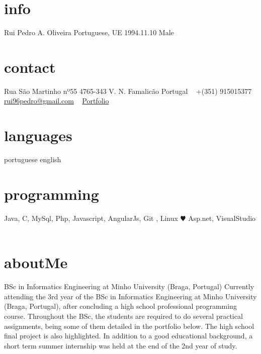\documentclass[]{friggeri-cv} %
\begin{document}


\begin{aside} %
\section{info}
Rui Pedro A. Oliveira
Portuguese, UE
1994.11.10
Male
\section{contact}
Rua São Martinho nº55
4765-343 V. N. Famalicão
Portugal
~
+(351) 915015377
~
\href{mailto:rui96pedro@gmail.com}{rui96pedro@gmail.com}
~
\href{https://bitbucket.org/ruiOliveiras94}{Portfolio}
~
\section{languages}
portuguese
english 
\section{programming}
Java, C, MySql,
Php, Javascript, AngularJs,
Git , Linux {\color{red} $\varheartsuit$} 
Asp.net, VisualStudio
~
\end{aside}

\section{aboutMe}
BSc in Informatics Engineering at Minho University (Braga, Portugal)
Currently attending the 3rd year of the BSc in Informatics Engineering at Minho University (Braga, Portugal), after concluding a high school professional programming course. Throughout the BSc, the students are required to do several practical assignments, being some of them detailed in the portfolio below. The high school final project is also highlighted. In addition to a good educational background, a short term summer internship was held at the end of the 2nd year of study.
\end{document}
